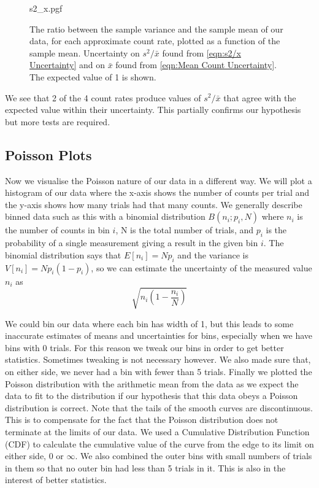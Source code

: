 \documentclass[12pt]{article}
\numberwithin{equation}{section}
\numberwithin{figure}{section}
\numberwithin{table}{section}
\begin{document}
\begin{figure}[H]
    \begin{center}
       {s2_x.pgf}
       \caption{The ratio between the sample variance and the sample mean of our data, for each approximate count rate, plotted as a function of the sample mean. Uncertainty on $s^2/\bar{x}$ found from \autoref{eqn:s2/x Uncertainty} and on $\bar{x}$ found from \autoref{eqn:Mean Count Uncertainty}. The expected value of 1 is shown.}
       \label{fig:s2_x}
    \end{center}
\end{figure}
\par We see that 2 of the 4 count rates produce values of $s^2/\bar{x}$ that agree with the expected value within their uncertainty. This partially confirms our hypothesis but more tests are required. 

\subsection{Poisson Plots}\label{sec:Poisson Plots}
\par Now we visualise the Poisson nature of our data in a different way. We will plot a histogram of our data where the x-axis shows the number of counts per trial and the y-axis shows how many trials had that many counts. We generally describe binned data such as this with a binomial distribution $B(n_i;p_i, N)$ where $n_i$ is the number of counts in bin $i$, N is the total number of trials, and $p_i$ is the probability of a single measurement giving a result in the given bin $i$. The binomial distribution says that $E[n_i]=Np_i$ and the variance is $V[n_i]=Np_i(1-p_i)$, so we can estimate the uncertainty of the measured value $n_i$ as 
\begin{equation}
    \sqrt{n_i\left(1-\frac{n_i}{N}\right)}
    \label{eqn:Bin Count Uncertainty}
\end{equation}
\par We could bin our data where each bin has width of 1, but this leads to some inaccurate estimates of means and uncertainties for bins, especially when we have bins with 0 trials. For this reason we tweak our bins in order to get better statistics. Sometimes tweaking is not necessary however. We also made sure that, on either side, we never had a bin with fewer than 5 trials. Finally we plotted the Poisson distribution with the arithmetic mean from the data as we expect the data to fit to the distribution if our hypothesis that this data obeys a Poisson distribution is correct. Note that the tails of the smooth curves are discontinuous. This is to compensate for the fact that the Poisson distribution does not terminate at the limits of our data. We used a Cumulative Distribution Function (CDF) to calculate the cumulative value of the curve from the edge to its limit on either side, 0 or $\infty$. We also combined the outer bins with small numbers of trials in them so that no outer bin had less than 5 trials in it. This is also in the interest of better statistics.
\end{document}
